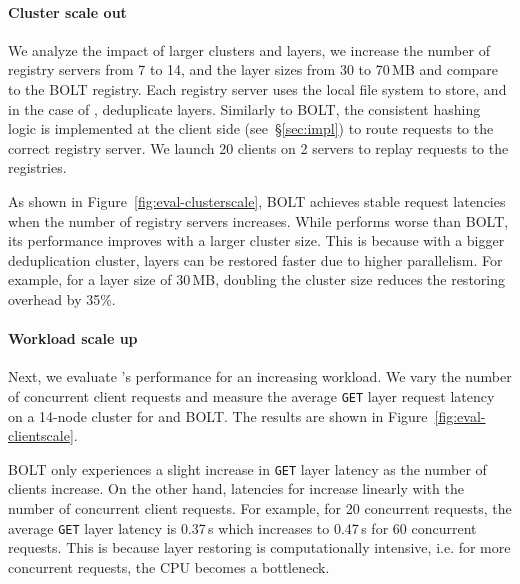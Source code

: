 
\paragraph{Cluster scale out}
%
We analyze the impact of larger clusters and layers, we increase the number of registry servers from
7 to 14, and the layer sizes from 30 to 70\,MB and compare \sysname to the BOLT registry.
%
Each registry server uses the local file system to store, and in the case of \sysname, deduplicate layers.
%
Similarly to BOLT, the consistent hashing logic is implemented at the client
side (see~\S\ref{sec:impl}) to route requests to the correct registry server.
We launch 20 clients on 2 servers to replay requests to the registries.

As shown in Figure~\ref{fig:eval-clusterscale}, BOLT achieves stable request latencies when
the number of registry servers increases.
%
While \sysname performs worse than BOLT, its performance improves with a larger cluster size.
%
This is because with a bigger deduplication cluster, layers can be restored faster due to higher
parallelism.
%
For example, for a layer size of 30\,MB, doubling the cluster size reduces the restoring
overhead by 35\%.

\paragraph{Workload scale up}
%
Next, we evaluate \sysname{}'s performance for an increasing workload.
%
We vary the number of concurrent client requests and measure the average \texttt{GET} layer
request latency on a 14-node cluster for \sysname and BOLT.
%
The results are shown in Figure~\ref{fig:eval-clientscale}.

BOLT only experiences a slight increase in \texttt{GET} layer latency as the number of clients increase.
%
On the other hand, latencies for \sysname increase linearly with the number of concurrent client requests.
%
For example, for 20 concurrent requests, the average \texttt{GET} layer latency is 0.37\,s which
increases to 0.47\,s for 60 concurrent requests.
%
This is because layer restoring is computationally intensive, i.e. for more concurrent requests, the CPU
becomes a bottleneck.

